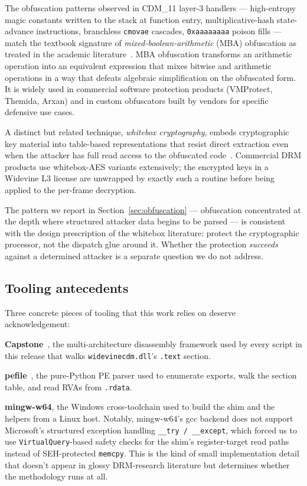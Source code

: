 \documentclass[11pt,letterpaper]{article}
\begin{document}
The obfuscation patterns observed in CDM\_11 layer-3 handlers ---
high-entropy magic constants written to the stack at function entry,
multiplicative-hash state-advance instructions, branchless
\texttt{cmovae} cascades, \texttt{0xaaaaaaaa} poison fills --- match
the textbook signature of \emph{mixed-boolean-arithmetic} (MBA)
obfuscation as treated in the academic
literature~\cite{eyrolles-mba, biondi-mba}. MBA obfuscation
transforms an arithmetic operation into an equivalent expression
that mixes bitwise and arithmetic operations in a way that defeats
algebraic simplification on the obfuscated form. It is widely used
in commercial software protection products (VMProtect, Themida,
Arxan) and in custom obfuscators built by vendors for specific
defensive use cases.

A distinct but related technique, \emph{whitebox cryptography},
embeds cryptographic key material into table-based representations
that resist direct extraction even when the attacker has full read
access to the obfuscated code~\cite{chow-aes-whitebox, lepoint-whitebox}.
Commercial DRM products use whitebox-AES variants extensively;
the encrypted keys in a Widevine L3 license are unwrapped by
exactly such a routine before being applied to the per-frame
decryption.

The pattern we report in Section~\ref{sec:obfuscation} ---
obfuscation concentrated at the depth where structured attacker
data begins to be parsed --- is consistent with the design
prescription of the whitebox literature: protect the cryptographic
processor, not the dispatch glue around it. Whether the protection
\emph{succeeds} against a determined attacker is a separate
question we do not address.

\subsection{Tooling antecedents}
\label{sec:ante-tools}

Three concrete pieces of tooling that this work relies on deserve
acknowledgement:

\textbf{Capstone}~\cite{capstone-tool}, the multi-architecture
disassembly framework used by every script in this release that
walks \texttt{widevinecdm.dll}'s \texttt{.text} section.

\textbf{pefile}~\cite{pefile-tool}, the pure-Python PE parser used
to enumerate exports, walk the section table, and read RVAs from
\texttt{.rdata}.

\textbf{mingw-w64}, the Windows cross-toolchain used to build the
shim and the helpers from a Linux host. Notably, mingw-w64's
gcc backend does not support Microsoft's structured exception
handling \texttt{\_\_try / \_\_except}, which forced us to use
\texttt{VirtualQuery}-based safety checks for the shim's
register-target read paths instead of SEH-protected
\texttt{memcpy}. This is the kind of small implementation detail
that doesn't appear in glossy DRM-research literature but determines
whether the methodology runs at all.
\end{document}
